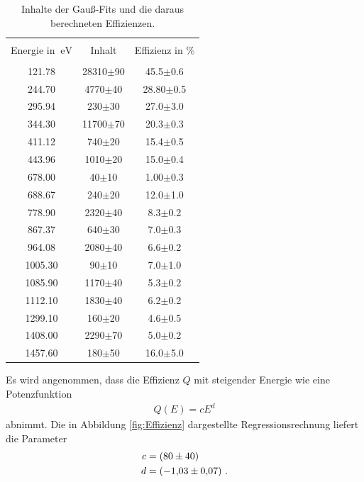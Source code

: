 \begin{table}
\centering
\caption{Inhalte der Gauß-Fits und die daraus berechneten Effizienzen.}
\begin{tabular}{c c c}
\hline \\
Energie in $\SI{}{\electronvolt}$ & Inhalt & Effizienz in \%\\
\hline \\
121.78 & 28310$\pm$90 & 45.5$\pm$0.6 \\ 244.70 & 4770$\pm$40 & 28.80$\pm$0.5 \\ 295.94 & 230$\pm$30 & 27.0$\pm$3.0 \\ 344.30 & 11700$\pm$70 & 20.3$\pm$0.3 \\ 411.12 & 740$\pm$20 & 15.4$\pm$0.5 \\ 443.96 & 1010$\pm$20 & 15.0$\pm$0.4 \\ 678.00 & 40$\pm$10 & 1.00$\pm$0.3 \\ 688.67 & 240$\pm$20 & 12.0$\pm$1.0 \\ 778.90 & 2320$\pm$40 & 8.3$\pm$0.2 \\ 867.37 & 640$\pm$30 & 7.0$\pm$0.3 \\ 964.08 & 2080$\pm$40 & 6.6$\pm$0.2 \\ 1005.30 & 90$\pm$10 & 7.0$\pm$1.0 \\ 1085.90 & 1170$\pm$40 & 5.3$\pm$0.2 \\ 1112.10 & 1830$\pm$40 & 6.2$\pm$0.2 \\ 1299.10 & 160$\pm$20 & 4.6$\pm$0.5 \\ 1408.00 & 2290$\pm$70 & 5.0$\pm$0.2 \\ 1457.60 & 180$\pm$50 & 16.0$\pm$5.0\\
\hline
\end{tabular}
\label{tab:atab2}
\end{table}
Es wird angenommen, dass die Effizienz $Q$ mit steigender Energie wie eine Potenzfunktion
\begin{align}
Q(E)=c E^{d}
\end{align}
abnimmt.
Die in Abbildung \ref{fig:Effizienz} dargestellte Regressionsrechnung liefert die Parameter
\begin{align*}
c&=\SI{80+-40}{}\\
d&=\SI{-1.03+-0.07}{}\text{ .}
\end{align*}
